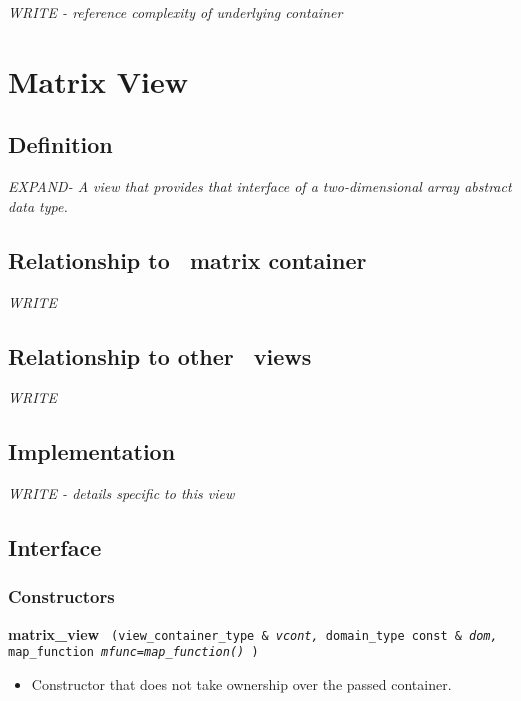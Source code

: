 \emph{WRITE - reference complexity of underlying container}


\section{Matrix View} \label{sec-matrix-vw}

\subsection{Definition}

\textit{ EXPAND- A view that provides that interface of a two-dimensional array abstract data type.}

\subsection{Relationship to \stapl\ matrix container}

\textit{WRITE}

\subsection{Relationship to other \stapl\ views}

\textit{WRITE}

\subsection{Implementation}

\textit{WRITE - details specific to this view}

\subsection{Interface} \label{sec-mat-vw-inter}

\subsubsection{Constructors}

\noindent
\textbf{matrix\_view}%
\texttt{%
(view\_container\_type \&
\textit{vcont,}%
domain\_type const \&
\textit{dom,}%
map\_function
\textit{mfunc=map\_function()}%
)
}

\begin{itemize}
\item
Constructor that does not take ownership over the passed container.
\end{itemize}

